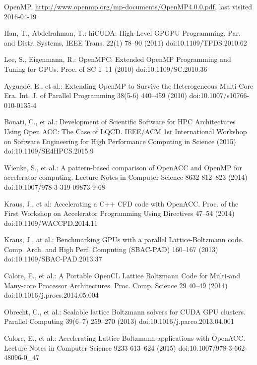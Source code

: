 \documentclass[times]{cpeauth}
\begin{document}
\begin{thebibliography}{10}
OpenMP.
\url{http://www.openmp.org/mp-documents/OpenMP4.0.0.pdf}, last visited 2016-04-19


Han, T., Abdelrahman, T.:
hiCUDA: High-Level GPGPU Programming.
Par. and Distr. Systems, IEEE Trans. 22(1) 78--90 (2011) 
doi:10.1109/TPDS.2010.62

Lee, S., Eigenmann, R.:
OpenMPC: Extended OpenMP Programming and Tuning for GPUs.
Proc. of SC 1--11 (2010) 
doi:10.1109/SC.2010.36

Ayguad{\'e}, E., et al.:
Extending OpenMP to Survive the Heterogeneous Multi-Core Era.
Int. J. of Parallel Programming 38(5-6) 440--459 (2010) 
doi:10.1007/s10766-010-0135-4

Bonati, C., et al.:
Development of Scientific Software for HPC Architectures Using Open ACC: The Case of LQCD.
IEEE/ACM 1st International Workshop on Software Engineering for High Performance Computing in Science (2015) 
doi:10.1109/SE4HPCS.2015.9

Wienke, S., et al.:
A pattern-based comparison of OpenACC and OpenMP for accelerator computing.
Lecture Notes in Computer Science 8632 812--823 (2014) 
doi:10.1007/978-3-319-09873-9-68

Kraus, J., et al:
Accelerating a C++ CFD code with OpenACC.
Proc. of the First Workshop on Accelerator Programming Using Directives 47--54 (2014) 
doi:10.1109/WACCPD.2014.11

Kraus, J., at al.:
Benchmarking GPUs with a parallel Lattice-Boltzmann code.
Comp. Arch. and High Perf. Computing (SBAC-PAD) 160--167 (2013) 
doi:10.1109/SBAC-PAD.2013.37

Calore, E., et al.:
A Portable OpenCL Lattice Boltzmann Code for Multi-and Many-core Processor Architectures.
Proc. Comp. Science 29 40--49 (2014) 
doi:10.1016/j.procs.2014.05.004

Obrecht, C., et al.:
Scalable lattice Boltzmann solvers for CUDA GPU clusters.
Parallel Computing 39(6--7) 259--270 (2013) 
doi:10.1016/j.parco.2013.04.001

Calore, E., et al.:
Accelerating Lattice Boltzmann applications with OpenACC.
Lecture Notes in Computer Science 9233 613--624 (2015)  
doi:10.1007/978-3-662-48096-0\_47


\end{thebibliography}
\end{document}

